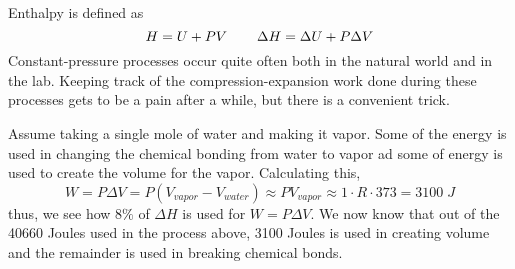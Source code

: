 \vspace{2ex}
\begin{defi}
Enthalpy is defined as 
\[H=U+PV\hspace{5ex}\Delta H=\Delta U+P\Delta V\]
Constant-pressure processes occur quite often both in the natural world and in the lab. Keeping track of the compression-expansion work done during these processes gets to be a pain after a while, but there is a convenient trick.
\end{defi}
\vspace{2ex}
\begin{ex}
Assume taking a single mole of water and making it vapor. Some of the energy is used in changing the chemical bonding from water to vapor ad some of energy is used to create the volume for the vapor. Calculating this,
\[W=P\Delta V=P(V_{vapor}-V_{water})\approx PV_{vapor}\approx 1 \cdot R\cdot 373 = 3100\;J\]
thus, we see how $8\%$ of $\Delta H$ is used for $W=P\Delta V$. We now know that out of the 40660 Joules used in the process above, 3100 Joules is used in creating volume and the remainder is used in breaking chemical bonds. 
\end{ex}
\vspace{2ex}

